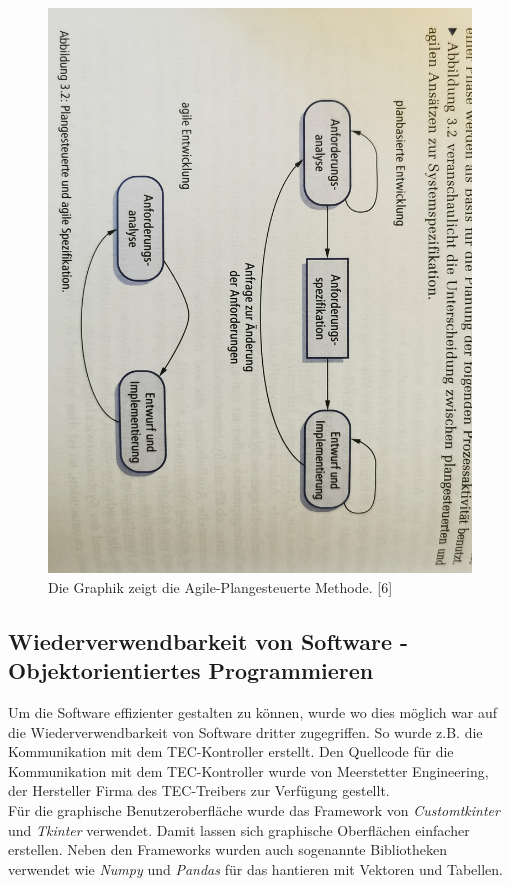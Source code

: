 \begin{figure}[H]
    \centering
    \includegraphics[scale=0.08, angle=90, clip]{98_images/plangesteuerte_agile_development.jpg}
    \caption{Die Graphik zeigt die Agile-Plangesteuerte Methode. [6]}
    \label{fig:agile_method}
\end{figure}


\subsection{Wiederverwendbarkeit von Software - Objektorientiertes Programmieren}
Um die Software effizienter gestalten zu können, wurde wo dies möglich war auf die Wiederverwendbarkeit von Software dritter zugegriffen. So wurde z.B. die Kommunikation mit dem TEC-Kontroller erstellt. Den Quellcode für die Kommunikation mit dem TEC-Kontroller wurde von Meerstetter Engineering, der Hersteller Firma des TEC-Treibers zur Verfügung gestellt.\\
Für die graphische Benutzeroberfläche wurde das Framework von \textit{Customtkinter} und \textit{Tkinter} verwendet. Damit lassen sich graphische Oberflächen einfacher erstellen. Neben den Frameworks wurden auch sogenannte Bibliotheken verwendet wie \textit{Numpy} und  \textit{Pandas} für das hantieren mit Vektoren und Tabellen.\\

